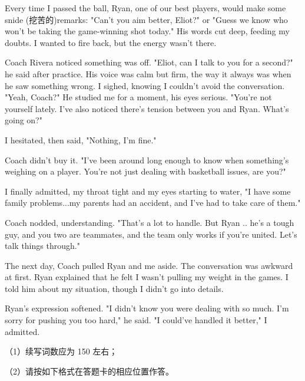 \documentclass{英语试卷}
\begin{document}
\par Every time I passed the ball, Ryan, one of our best players, would make some snide (挖苦的)remarks: "Can’t you aim better, Eliot?" or "Guess we know who won’t be taking the game-winning shot today." His words cut deep, feeding my doubts. I wanted to fire back, but the energy wasn’t there.\par
\par Coach Rivera noticed something was off. "Eliot, can I talk to you for a second?" he said after practice. His voice was calm but firm, the way it always was when he saw something wrong. I sighed, knowing I couldn't avoid the conversation. "Yeah, Coach?" He studied me for a moment, his eyes serious. "You're not yourself lately. I've also noticed there's tension between you and Ryan. What's going on?"\par
\par I hesitated, then said, "Nothing, I'm fine."\par
\par Coach didn't buy it. "I've been around long enough to know when something's weighing on a player. You're not just dealing with basketball issues, are you?"\par
\par I finally admitted, my throat tight and my eyes starting to water, "I have some family problems...my parents had an accident, and I've had to take care of them."\par
\par Coach nodded, understanding. "That's a lot to handle. But Ryan .. he's a tough guy, and you two are teammates, and the team only works if you're united. Let's talk things through."\par
\par The next day, Coach pulled Ryan and me aside. The conversation was awkward at first. Ryan explained that he felt I wasn't pulling my weight in the games. I told him about my situation, though I didn't go into details.\par
\par Ryan's expression softened. "I didn't know you were dealing with so much. I'm sorry for pushing you too hard," he said. "I could've handled it better," I admitted.\par
\par （1）续写词数应为 150 左右；\par
\par （2）请按如下格式在答题卡的相应位置作答。\par
{}
\end{document}
